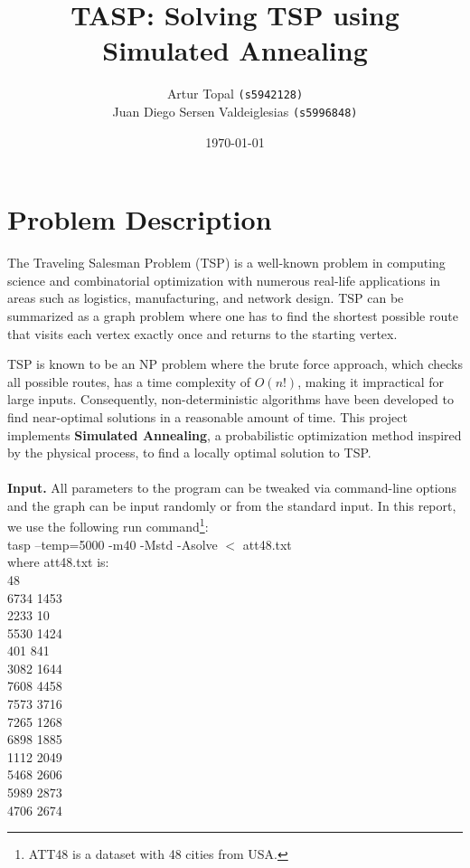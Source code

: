 \documentclass{article}
\title{TASP: Solving TSP using Simulated Annealing}
\author{
    Artur Topal \texttt{(s5942128)} \\
    Juan Diego Sersen Valdeiglesias \texttt{(s5996848)}
}
\date{\today}
\begin{document}
\maketitle

\section{Problem Description}

The Traveling Salesman Problem (TSP) is a well-known problem in computing science and combinatorial optimization with numerous real-life applications in areas such as logistics, manufacturing, and network design. TSP can be summarized as a graph problem where one has to find the shortest possible route that visits each vertex exactly once and returns to the starting vertex.

TSP is known to be an NP problem where the brute force approach, which checks all possible routes, has a time complexity of \( O(n!) \), making it impractical for large inputs. Consequently, non-deterministic algorithms have been developed to find near-optimal solutions in a reasonable amount of time.
This project implements \textbf{Simulated Annealing}, a probabilistic optimization method inspired by the physical process, to find a locally optimal solution to TSP.
\\
\\
\textbf{Input.} All parameters to the program can be tweaked via command-line options and the graph can be input randomly or from the standard input. In this report, we use the following run command\footnote{ATT48 is a dataset with 48 cities from USA.}:  \\
tasp --temp=5000 -m40 -Mstd -Asolve $<$ att48.txt \\
where att48.txt is: \\
48          \\
6734 1453   \\
2233   10   \\
5530 1424   \\
 401  841   \\
3082 1644   \\
7608 4458   \\
7573 3716   \\
7265 1268   \\
6898 1885   \\
1112 2049   \\
5468 2606   \\
5989 2873   \\
4706 2674   \\
\end{document}
